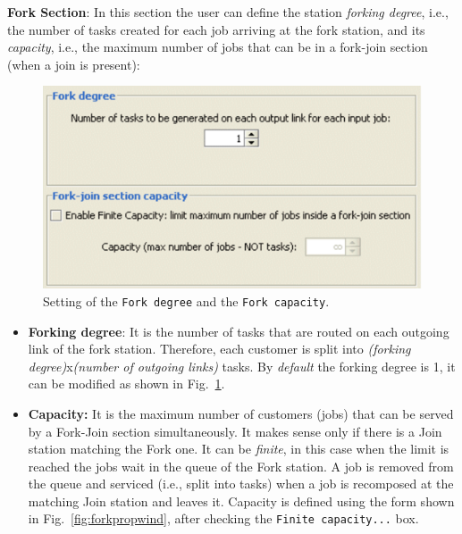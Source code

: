 \noindent \textbf{Fork Section}: In this section the user can
define the station \emph{forking degree}, i.e., the number of
tasks created for each job arriving at the fork station, and its
\emph{capacity}, i.e., the maximum number of jobs that can be in a
fork-join section (when a join is present):
\begin{figure}[htb]
    \begin{center}
        \includegraphics[scale=.5]{img/jsimg/8.21.eps}
    \end{center}
    \caption{Setting of the \texttt{Fork degree} and the \texttt{Fork capacity}.}
    \label{fig:forkdegcap}
\end{figure}
\begin{itemize}
\item \textbf{Forking degree}: It is the number of tasks that are
routed on each outgoing link of the fork station. Therefore, each
customer is split into \emph{(forking degree)}x\emph{(number of
outgoing links)} tasks. By \emph{default} the forking degree is 1,
it can be modified as shown in Fig.~\ref{fig:forkdegcap}. \item
\textbf{Capacity:} It is the maximum number of customers (jobs)
that can be served by a Fork-Join section simultaneously. It makes
sense only if there is a Join station matching the Fork one. It
can be \emph{finite}, in this case when the limit is reached the
jobs wait in the queue of the Fork station. A job is removed from
the queue and serviced (i.e., split into tasks) when a job is
recomposed at the matching Join station and leaves it. Capacity is
defined using the form shown in Fig.~\ref{fig:forkpropwind}, after
checking the \texttt{Finite capacity...} box.
\end{itemize}

